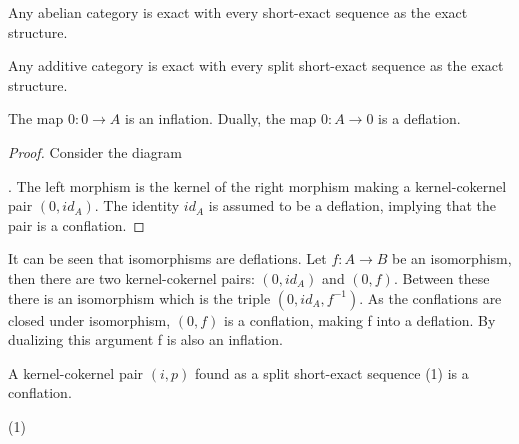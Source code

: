     \begin{example}
        Any abelian category is exact with every short-exact sequence as the exact structure.
    \end{example}

    \begin{example}
        Any additive category is exact with every split short-exact sequence as the exact structure.
    \end{example}

    \begin{lemma}
        The map $0:0\rightarrow A$ is an inflation. Dually, the map $0:A\rightarrow 0$ is a deflation.
    \end{lemma}

    \begin{proof}
        Consider the diagram . The left morphism is the kernel of the right morphism making a kernel-cokernel pair $(0,id_A)$. The identity $id_A$ is assumed to be a deflation, implying that the pair is a conflation.
    \end{proof}

    \begin{remark}
        It can be seen that isomorphisms are deflations. Let $f:A\rightarrow B$ be an isomorphism, then there are two kernel-cokernel pairs: $(0,id_A)$ and $(0,f)$. Between these there is an isomorphism which is the triple $(0,id_A,f^{-1})$. As the conflations are closed under isomorphism, $(0,f)$ is a conflation, making f into a deflation. By dualizing this argument f is also an inflation.
        \begin{center}
        \end{center}
    \end{remark}

    \begin{corollary}
        A kernel-cokernel pair $(i,p)$ found as a split short-exact sequence (1) is a conflation. 
        
        \begin{center}
            (1)
        \end{center}
    \end{corollary}

